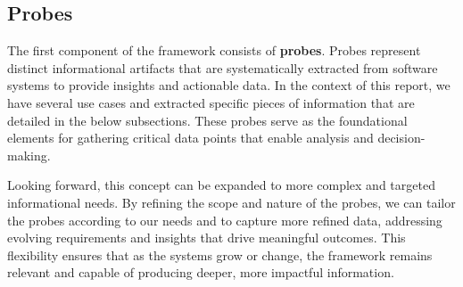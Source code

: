 \subsection{Probes}\label{subsec:component-probes}

The first component of the framework consists of \textbf{probes}. Probes represent distinct informational artifacts that are systematically extracted from software systems to provide insights and actionable data. In the context of this report, we have several use cases and extracted specific pieces of information that are detailed in the below subsections. These probes serve as the foundational elements for gathering critical data points that enable analysis and decision-making. 

Looking forward, this concept can be expanded to more complex and targeted informational needs. By refining the scope and nature of the probes, we can tailor the probes according to our needs and to capture more refined data, addressing evolving requirements and insights that drive meaningful outcomes. This flexibility ensures that as the systems grow or change, the framework remains relevant and capable of producing deeper, more impactful information.

